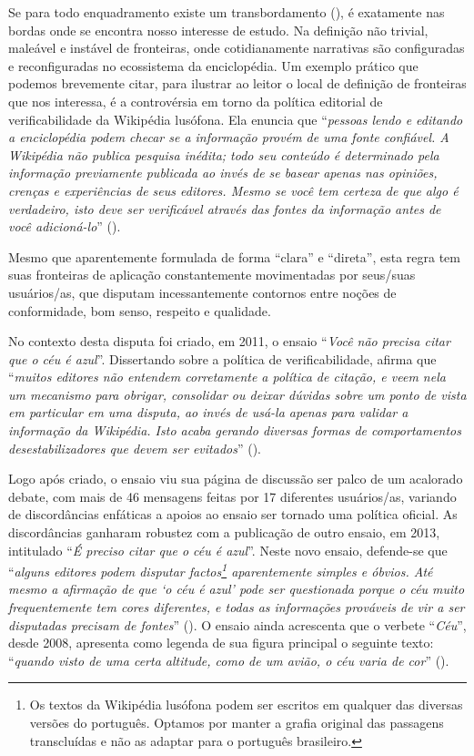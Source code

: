Se para todo enquadramento existe um transbordamento (\cite{callon_markets_1998}), é exatamente nas bordas onde se encontra nosso interesse de estudo. Na definição não trivial, maleável e instável de fronteiras, onde cotidianamente narrativas são configuradas e reconfiguradas no ecossistema da enciclopédia. Um exemplo prático que podemos brevemente citar, para ilustrar ao leitor o local de definição de fronteiras que nos interessa, é a controvérsia em torno da política editorial de verificabilidade da Wikipédia lusófona. Ela enuncia que ``\textit{pessoas lendo e editando a enciclopédia podem checar se a informação provém de uma fonte confiável. A Wikipédia não publica pesquisa inédita; todo seu conteúdo é determinado pela informação previamente publicada ao invés de se basear apenas nas opiniões, crenças e experiências de seus editores. Mesmo se você tem certeza de que algo é verdadeiro, isto deve ser verificável através das fontes da informação antes de você adicioná-lo}'' ().

Mesmo que aparentemente formulada de forma ``clara'' e ``direta'', esta regra tem suas fronteiras de aplicação constantemente movimentadas por seus/suas usuários/as, que disputam incessantemente contornos entre noções de conformidade, bom senso, respeito e qualidade.

No contexto desta disputa foi criado, em 2011, o ensaio ``\textit{Você não precisa citar que o céu é azul}''. Dissertando sobre a política de verificabilidade, afirma que ``\textit{muitos editores não entendem corretamente a política de citação, e veem nela um mecanismo para obrigar, consolidar ou deixar dúvidas sobre um ponto de vista em particular em uma disputa, ao invés de usá-la apenas para validar a informação da Wikipédia. Isto acaba gerando diversas formas de comportamentos desestabilizadores que devem ser evitados}'' ().

Logo após criado, o ensaio viu sua página de discussão ser palco de um acalorado debate, com mais de 46 mensagens feitas por 17 diferentes usuários/as, variando de discordâncias enfáticas a apoios ao ensaio ser tornado uma política oficial. As discordâncias ganharam robustez com a publicação de outro ensaio, em 2013, intitulado ``\textit{É preciso citar que o céu é azul}''. Neste novo ensaio, defende-se que ``\textit{alguns editores podem disputar factos\footnote{Os textos da Wikipédia lusófona podem ser escritos em qualquer das diversas versões do português. Optamos por manter a grafia original das passagens transcluídas e não as adaptar para o português brasileiro.} aparentemente simples e óbvios. Até mesmo a afirmação de que ‘o céu é azul’ pode ser questionada porque o céu muito frequentemente tem cores diferentes, e todas as informações prováveis de vir a ser disputadas precisam de fontes}'' (). O ensaio ainda acrescenta que o verbete ``\textit{Céu}'', desde 2008, apresenta como legenda de sua figura principal o seguinte texto: ``\textit{quando visto de uma certa altitude, como de um avião, o céu varia de cor}'' ().

